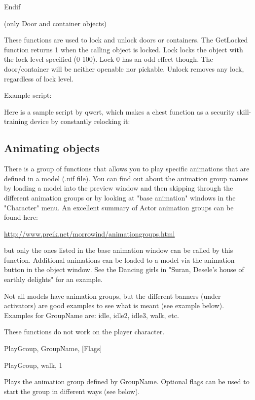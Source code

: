 \documentclass[
]{article}
\begin{document}
Endif

(only Door and container objects)

These functions are used to lock and unlock doors or containers. The
GetLocked function returns 1 when the calling object is locked. Lock
locks the object with the lock level specified (0-100). Lock 0 has an
odd effect though. The door/container will be neither openable nor
pickable. Unlock removes any lock, regardless of lock level.

Example script:

Here is a sample script by qwert, which makes a chest function as a
security skill-training device by constantly relocking it:



\hypertarget{animating-objects}{%
\subsection{Animating objects}\label{animating-objects}}

There is a group of functions that allows you to play specific
animations that are defined in a model (.nif file). You can find out
about the animation group names by loading a model into the preview
window and then skipping through the different animation groups or by
looking at "base animation" windows in the "Character" menu. An
excellent summary of Actor animation groups can be found here:

\href{http://morrowind.preik.net/animationgroups.html}{http://www.preik.net/morrowind/animationgroups.html}

but only the ones listed in the base animation window can be called by
this function. Additional animations can be loaded to a model via the
animation button in the object window. See the Dancing girls in "Suran,
Desele's house of earthly delights" for an example.

Not all models have animation groups, but the different banners (under
activators) are good examples to see what is meant (see example below).
Examples for GroupName are: idle, idle2, idle3, walk, etc.

These functions do not work on the player character.

PlayGroup, GroupName, {[}Flags{]}

PlayGroup, walk, 1

Plays the animation group defined by GroupName. Optional flags can be
used to start the group in different ways (see below).
\end{document}
